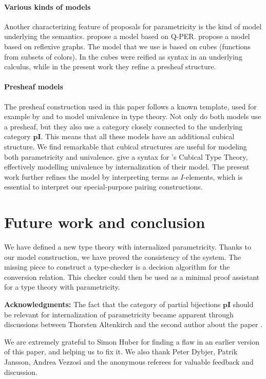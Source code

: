 \documentclass[english]{PaperTools/latex/entcs}
\theoremstyle{plain}
\theoremstyle{definition}
\theoremstyle{remark}
\def\pI{\ensuremath{\mathbf{pI}}}
\begin{document}
\paragraph{Various kinds of models}
Another characterizing feature of proposals for parametricity is the
kind of model underlying the
semantics.  propose a model
based on Q-PER.  propose a model based
on reflexive graphs. The model that we use is based on cubes
(functions from subsets of colors). In \citet{bernardy_computational_2012}
the cubes were reified as syntax in an underlying calculus, while in the
present work they refine a presheaf structure.

\paragraph{Presheaf models}
The presheaf construction used in this paper follows a known template,
used for example by \citet{bezem2014model} and \citet{DBLP:journals/corr/Pitts14}
to model univalence in type theory. Not only do both models use a
presheaf, but they also use a category closely connected to the
underlying category $\pI$.
This means that all these models have an additional cubical structure.
We find remarkable that cubical structures are useful for modeling both
parametricity and univalence.
\citet{altenkirch2014syntax} give a syntax for
\citeauthor{bezem2014model}'s Cubical Type Theory, effectively modelling
univalence by internalization of their model.
The present work further refines the model by interpreting terms as
$I$-elements, which is essential to interpret our special-purpose
pairing constructions.

\section{Future work and conclusion}
We have defined a new type theory with internalized parametricity.
Thanks to our model construction, we have proved the consistency of
the system. The missing piece to construct a type-checker is a
decision algorithm for the conversion relation.  This checker could
then be used as a minimal proof assistant for a type theory with
parametricity.

\bigskip
\noindent
\textbf{Acknowledgments:}
The fact that the category of partial bijections \pI{} should be
relevant for internalization of parametricity became apparent through
discussions between Thorsten Altenkirch and the second  author about
the paper \citep{bernardy_computational_2012}.

We are extremely grateful to Simon Huber for finding a flaw in an
earlier version of this paper, and helping us to fix it.
We also thank Peter Dybjer, Patrik Jansson, Andrea Vezzosi and the
anonymous referees for valuable feedback and discussion.

\newcommand{\newblock}{}


\end{document}
